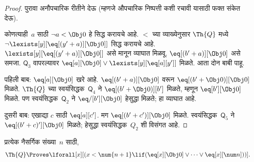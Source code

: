 \begin{proof}
पुरावा अनौपचारिक रीतीने देऊ (म्हणजे औपचारिक निष्पत्ती
कशी रचावी यासाठी फक्त संकेत देऊ).

कोणत्याही~$a$ साठी $\lnot a < \Obj 0$ हे सिद्ध करायचे आहे.
$<$ च्या व्याख्येनुसार $\Th{Q}$ मध्ये
$\lnot \lexists[y][\eq[(y'+a)][\Obj 0]]$ सिद्ध करायचे आहे.
$\lexists[y][\eq[(y'+a)][\Obj 0]]$ असे मानून व्याघात मिळवू.
$\eq[(b'+a)][\Obj 0]$ असे समजा. $\mathsf{Q}_3$ वापरल्यावर
$\eq[a][\Obj 0] \lor \lexists[y][\eq[a][y']]$ मिळते.
आता दोन बाबी पाहू.

पहिली बाब: $\eq[a][\Obj 0]$ खरे आहे. $\eq[(b'+a)][\Obj 0]$
वरून $\eq[(b' + \Obj 0)][\Obj 0]$ मिळते. $\Th{Q}$ च्या
स्वयंसिद्धक~$\mathsf{Q}_4$ ने $\eq[(b' + \Obj 0)][b']$ मिळते,
म्हणून $\eq[b'][\Obj 0]$ मिळते. पण स्वयंसिद्धक~$\mathsf{Q}_2$ ने
$\eq/[b'][\Obj 0]$ हेसुद्धा मिळते; हा व्याघात आहे.

दुसरी बाब: एखाद्या $c$ साठी $\eq[a][c']$. मग
$\eq[(b' +
c')][\Obj 0]$ मिळते. स्वयंसिद्धक~$\mathsf{Q}_5$ ने
$\eq[(b' + c)'][\Obj 0]$ मिळते; हेसुद्धा स्वयंसिद्धक~$Q_2$
शी विसंगत आहे.
\end{proof}

\begin{lem}
\label{inc:req:min:lem:less-nsucc}
प्रत्येक नैसर्गिक संख्या~$n$ साठी,
  \[  \Th{Q} \Proves
  \lforall[x][(x < \num {n+1} \lif (\eq[x][\Obj 0] \lor \dots \lor
    \eq[x][\num n]))].
  \]
\end{lem}

